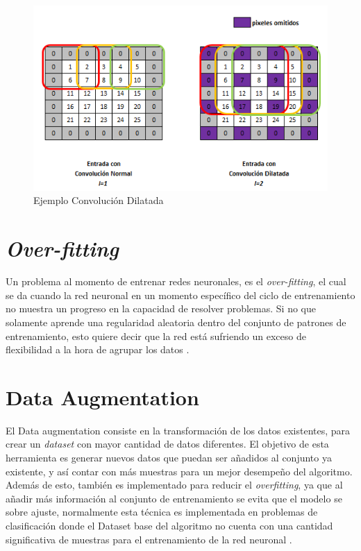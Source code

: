 \begin{figure}[ht]
	\centering
	\includegraphics[scale=0.6]{Figs/Convolucion_dilatada.png}
	\caption{Ejemplo Convolución Dilatada}
	\label{fig:cd}
\end{figure}

\section{\textit{Over-fitting}}

Un problema al momento de entrenar redes neuronales, es el \textit{over-fitting}, el cual se da cuando la red neuronal en un momento específico del ciclo de entrenamiento no muestra un progreso en la capacidad de resolver problemas. Si no que solamente aprende una regularidad aleatoria dentro del conjunto de patrones de entrenamiento, esto quiere decir que la red está sufriendo un exceso de flexibilidad a la hora de agrupar los datos \cite{jabbar2015methods}.


\section{Data Augmentation}
El Data augmentation consiste en la transformación de los datos existentes, para crear un \textit{dataset} con mayor cantidad de datos diferentes. El objetivo de esta herramienta es generar nuevos datos que puedan ser añadidos al conjunto ya existente, y así contar con más muestras para un mejor desempeño del algoritmo. Además de esto, también es implementado para reducir el \textit{overfitting}, ya que al añadir más información al conjunto de entrenamiento se evita que el modelo se sobre ajuste, normalmente esta técnica es implementada en problemas de clasificación donde el Dataset base del algoritmo no cuenta con una cantidad significativa de muestras para el entrenamiento de la red neuronal \cite{data}. \\



